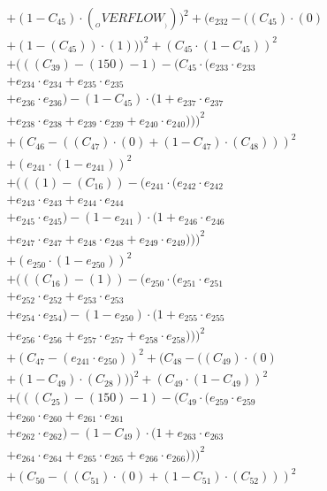 \documentclass[10pt, a4paper]{article}
\begin{document}
\begin{align*}
& + (1 - C_{45})  \cdot  (__OVERFLOW__)))^{2} + (e_{232} - ((C_{45}) \cdot (0) \\
& + (1 - (C_{45})) \cdot (1)))^{2} + (C_{45} \cdot (1 - C_{45}))^{2} \\
& + (((C_{39}) - (150) - 1) - (C_{45} \cdot (e_{233} \cdot e_{233} \\
& + e_{234} \cdot e_{234} + e_{235} \cdot e_{235} \\
& + e_{236} \cdot e_{236}) - (1 - C_{45}) \cdot (1 + e_{237} \cdot e_{237} \\
& + e_{238} \cdot e_{238} + e_{239} \cdot e_{239} + e_{240} \cdot e_{240})))^{2} \\
& + (C_{46} - ((C_{47})  \cdot  (0) + (1 - C_{47})  \cdot  (C_{48})))^{2} \\
& + (e_{241} \cdot (1 - e_{241}))^{2} \\
& + (((1) - (C_{16})) - (e_{241} \cdot (e_{242} \cdot e_{242} \\
& + e_{243} \cdot e_{243} + e_{244} \cdot e_{244} \\
& + e_{245} \cdot e_{245}) - (1 - e_{241}) \cdot (1 + e_{246} \cdot e_{246} \\
& + e_{247} \cdot e_{247} + e_{248} \cdot e_{248} + e_{249} \cdot e_{249})))^{2} \\
& + (e_{250} \cdot (1 - e_{250}))^{2} \\
& + (((C_{16}) - (1)) - (e_{250} \cdot (e_{251} \cdot e_{251} \\
& + e_{252} \cdot e_{252} + e_{253} \cdot e_{253} \\
& + e_{254} \cdot e_{254}) - (1 - e_{250}) \cdot (1 + e_{255} \cdot e_{255} \\
& + e_{256} \cdot e_{256} + e_{257} \cdot e_{257} + e_{258} \cdot e_{258})))^{2} \\
& + (C_{47} - (e_{241} \cdot e_{250}))^{2} + (C_{48} - ((C_{49})  \cdot  (0) \\
& + (1 - C_{49})  \cdot  (C_{28})))^{2} + (C_{49} \cdot (1 - C_{49}))^{2} \\
& + (((C_{25}) - (150) - 1) - (C_{49} \cdot (e_{259} \cdot e_{259} \\
& + e_{260} \cdot e_{260} + e_{261} \cdot e_{261} \\
& + e_{262} \cdot e_{262}) - (1 - C_{49}) \cdot (1 + e_{263} \cdot e_{263} \\
& + e_{264} \cdot e_{264} + e_{265} \cdot e_{265} + e_{266} \cdot e_{266})))^{2} \\
& + (C_{50} - ((C_{51})  \cdot  (0) + (1 - C_{51})  \cdot  (C_{52})))^{2} \\

\end{align*}
\end{document}
